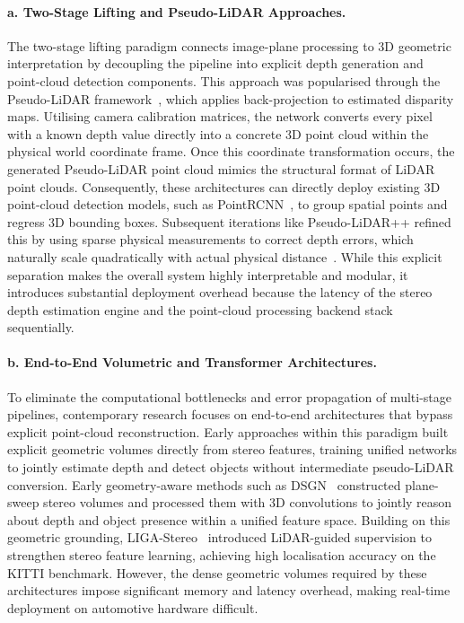 \paragraph{a. Two-Stage Lifting and Pseudo-LiDAR Approaches.}
The two-stage lifting paradigm connects image-plane processing to 3D geometric
interpretation by decoupling the pipeline into explicit depth generation and
point-cloud detection components. This approach was popularised through the
Pseudo-LiDAR framework~\cite{wang2019pseudolidar}, which applies back-projection
to estimated disparity maps. Utilising camera calibration matrices, the network
converts every pixel with a known depth value directly into a concrete 3D point
cloud within the physical world coordinate frame. Once this coordinate
transformation occurs, the generated Pseudo-LiDAR point cloud mimics the
structural format of LiDAR point clouds. Consequently, these architectures can
directly deploy existing 3D point-cloud detection models, such as
PointRCNN~\cite{shi2019}, to group spatial points and regress 3D bounding boxes.
Subsequent iterations like Pseudo-LiDAR++ refined this by using sparse physical
measurements to correct depth errors, which naturally scale quadratically with
actual physical distance~\cite{you2020}. While this explicit separation makes the
overall system highly interpretable and modular, it introduces substantial
deployment overhead because the latency of the stereo depth estimation engine and
the point-cloud processing backend stack sequentially.

\paragraph{b. End-to-End Volumetric and Transformer Architectures.}
To eliminate the computational bottlenecks and error propagation of multi-stage
pipelines, contemporary research focuses on end-to-end architectures that bypass
explicit point-cloud reconstruction. Early approaches within this paradigm built
explicit geometric volumes directly from stereo features, training unified
networks to jointly estimate depth and detect objects without intermediate
pseudo-LiDAR conversion. Early geometry-aware methods such as
DSGN~\cite{chen2020dsgn} constructed plane-sweep stereo volumes and processed them
with 3D convolutions to jointly reason about depth and object presence within a
unified feature space. Building on this geometric grounding,
LIGA-Stereo~\cite{guo2021} introduced LiDAR-guided supervision to strengthen
stereo feature learning, achieving high localisation accuracy on the KITTI
benchmark. However, the dense geometric volumes required by these architectures
impose significant memory and latency overhead, making real-time deployment on
automotive hardware difficult.

